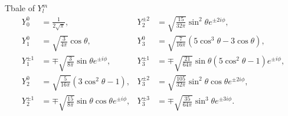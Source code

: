 \documentclass{article}
\newcommand{\su}[1]{\vspace{-#1 pt}}%
\begin{document}
\begin{example}{Tbale of $Y_l^m$}{}
	\su{12}
	\begin{align*}
		Y_0^0~\;    & =\frac1{2\sqrt\pi},                                           & Y_2^{\pm 2} & =\sqrt{\frac{15}{32\pi}}\sin^2\theta e^{\pm 2i\phi},                 \\
		Y_1^0~\;    & =\sqrt{\frac3{4\pi}}\cos\theta,                               & Y_3^0~\;    & =\sqrt{\frac7{16\pi}}(5\cos^3\theta-3\cos\theta),                    \\
		Y_1^{\pm 1} & =\mp\sqrt{\frac3{8\pi}}\sin\theta e^{\pm i\phi},              & Y_3^{\pm 1} & =\mp\sqrt{\frac{21}{64\pi}}\sin\theta(5\cos^2\theta-1)e^{\pm i\phi}, \\
		Y_2^0~\;    & =\sqrt{\frac5{16\pi}}(3\cos^2\theta-1),                       & Y_3^{\pm 2} & =\sqrt{\frac{105}{32\pi}}\sin^2\theta\cos\theta e^{\pm 2i\phi},      \\
		Y_2^{\pm 1} & =\mp\sqrt{\frac{15}{8\pi}}\sin\theta\cos\theta e^{\pm i\phi}, & Y_3^{\pm 3} & =\mp\sqrt{\frac{35}{64\pi}}\sin^3\theta e^{\pm 3i\phi}.
	\end{align*}
\end{example}
\newpage
\end{document}

